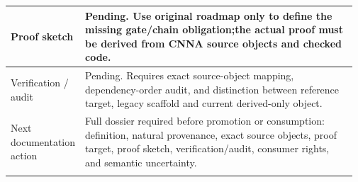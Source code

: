 \begin{longtable}{L{0.16\linewidth} L{0.81\linewidth}}
\hline\addlinespace[0.20em]
Proof sketch & Pending. Use original roadmap only to define the missing gate/\allowbreak{}chain obligation;\newline the actual proof must be derived from CNNA source objects and checked code.\\
\hline\addlinespace[0.20em]
Verification /\allowbreak{} audit & Pending. Requires exact source-object mapping, dependency-order audit, and distinction between reference target, legacy scaffold and current derived-only object.\\
\hline\addlinespace[0.20em]
Next documentation action & Full dossier required before promotion or consumption: definition, natural provenance, exact source objects, proof target, proof sketch, verification/\allowbreak{}audit, consumer rights, and semantic uncertainty.\\
\hline\addlinespace[0.20em]
\end{longtable}
